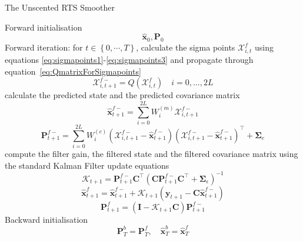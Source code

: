 \documentclass[10pt,a4paper]{article}
\begin{document}
\begin{algorithm}
	\begin{small}
	\caption{The Unscented RTS Smoother}\label{UKFAlgorithm} 
	\begin{algorithmic}[1] 
		\State Forward initialisation 
		\begin{equation*}
		 \hat{\mathbf x}_0, \mathbf P_0 
		\end{equation*}
		\State Forward iteration: for $t \in \left\lbrace 0,\cdots, T\right\rbrace $,
		calculate the sigma points $\mathcal X_{i,t}^f$ using equations \ref{eq:sigmapoints1}-\ref{eq:sigmapoints3} and propagate through equation~\ref{eq:QmatrixForSigmapoints}
		\begin{equation*}
			\mathcal X_{i,t+1}^{f-}=Q(\mathcal X_{i,t}^f) \quad i=0, \dots, 2L
		\end{equation*}
		calculate the predicted state and the predicted covariance matrix
		\begin{equation*}
			\hat{\mathbf x}_{t+1}^{f-}=\sum_{i=0}^{2L} W_i^{(m)}\mathcal X_{i,t+1}^{f-} 
		\end{equation*}
		\begin{equation*}
			\mathbf P_{t +1}^{f-}=\sum_{i=0}^{2L} W_i^{(c)}(\mathcal X_{i,t+1}^{f-}-\hat{\mathbf x}_{t +1}^{f-})(\mathcal X_{i,t+1}^{f-}-\hat{\mathbf x}_{t +1}^{f-})^\top+\boldsymbol \Sigma_e 
		\end{equation*}
		compute the filter gain, the filtered state and the filtered covariance matrix using the standard Kalman Filter update equations
		\begin{equation*}
			\mathcal K_{t+1}=\mathbf P_{t +1}^{f-}\mathbf C ^\top(\mathbf C \mathbf P_{t +1}^{f-}\mathbf C ^\top+\boldsymbol \Sigma_{\epsilon})^{-1} 
		\end{equation*}
		\begin{equation*}
			\hat{\mathbf x}_{t+1}^{f}=\hat{\mathbf x}_{t+1}^{f-}+\mathcal K_{t+1}(\mathbf y_{t+1}-\mathbf C\hat{\mathbf x}_{t +1}^{f-}) 
		\end{equation*}
		\begin{equation*}
			\mathbf P_{t+1}^f=(\mathbf I - \mathcal K_{t+1}\mathbf C)\mathbf P_{t +1}^{f-} 
		\end{equation*}
		\State Backward initialisation 
		\begin{equation*}
			\mathbf P_T^b= \mathbf P_T^f, \quad \hat{\mathbf x}^b_T= \hat{\mathbf x}^f_T 
		\end{equation*}

\end{algorithmic}
\end{small}
\end{algorithm}
\end{document}
